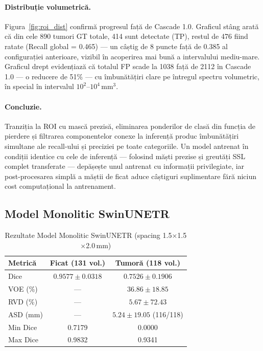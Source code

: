 \documentclass[12pt, a4paper]{report}
\begin{document}
\paragraph{Distribuție volumetrică.}
Figura~\ref{fig:roi_dist} confirmă progresul față de Cascade 1.0. Graficul stâng arată că din cele 890 tumori GT totale, 414 sunt detectate (TP), restul de 476 fiind ratate (Recall global = 0.465) — un câștig de 8 puncte față de 0.385 al configurației anterioare, vizibil în acoperirea mai bună a intervalului mediu-mare. Graficul drept evidențiază că totalul FP scade la 1038 față de 2112 în Cascade 1.0 — o reducere de 51\% — cu îmbunătățiri clare pe întregul spectru volumetric, în special în intervalul $10^2$–$10^4$\,mm$^3$.

\paragraph{Concluzie.}
Tranziția la ROI cu mască prezisă, eliminarea ponderilor de clasă din funcția de pierdere și filtrarea componentelor conexe la inferență produc îmbunătățiri simultane ale recall-ului și preciziei pe toate categoriile. Un model antrenat în condiții identice cu cele de inferență — folosind măști prezise și greutăți SSL complet transferate — depășește unul antrenat cu informații privilegiate, iar post-procesarea simplă a măștii de ficat aduce câștiguri suplimentare fără niciun cost computațional la antrenament.



\subsection{Model Monolitic SwinUNETR}

\begin{table}[H]
\centering
\caption{Rezultate Model Monolitic SwinUNETR (spacing 1.5$\times$1.5$\times$2.0\,mm)}
\label{tab:monolit_seg}
\begin{tabular}{lcc}
\hline
\textbf{Metrică} & \textbf{Ficat (131 vol.)} & \textbf{Tumoră (118 vol.)} \\
\hline
Dice              & $0.9577 \pm 0.0318$ & $0.7526 \pm 0.1906$ \\
VOE (\%)          & ---                 & $36.86 \pm 18.85$ \\
RVD (\%)          & ---                 & $5.67 \pm 72.43$ \\
ASD (mm)          & ---                 & $5.24 \pm 19.05$ (116/118) \\
Min Dice          & 0.7179              & 0.0000 \\
Max Dice          & 0.9832              & 0.9341 \\
\hline
\end{tabular}
\end{table}
\end{document}
